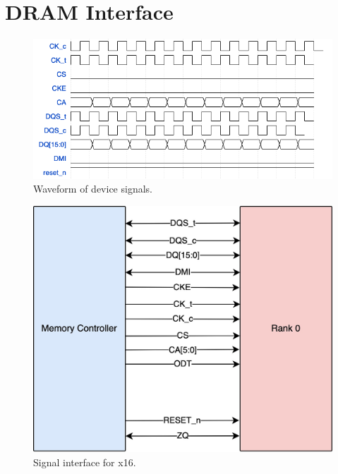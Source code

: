 \section{DRAM Interface}
\begin{figure}
    \centering
    \includegraphics[scale=0.5]{images/signals.png}
    \caption{Waveform of device signals.}
    \label{fig:dram-io}
\end{figure}
\begin{figure}
    \centering
    \includegraphics[scale=0.2]{images/signal-int.jpg}
    \caption{Signal interface for x16.}
    \label{fig:sig-int}
\end{figure}

